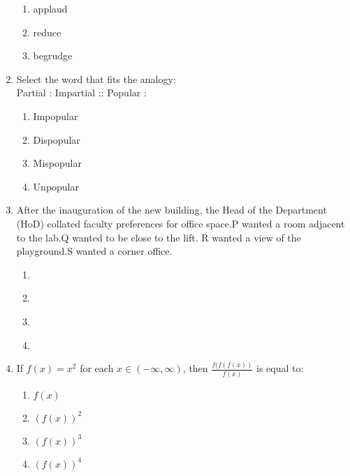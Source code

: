 \documentclass[journal,12pt,onecolumn]{IEEEtran}
\theoremstyle{remark}
\begin{document}
\begin{enumerate}
\begin{enumerate}
        \item applaud
        \item reduce
        \item begrudge
    \end{enumerate}
    \item Select the word that fits the analogy:\\
    Partial : Impartial :: Popular :
    \begin{enumerate}
        \item Impopular
        \item Dispopular
        \item Mispopular
        \item Unpopular
    \end{enumerate}
    \item After the inauguration of the new building, the Head of the Department (HoD) collated faculty preferences for office space.P wanted a room adjacent to the lab.Q wanted to be close to the lift. R wanted a view of the playground.S wanted a corner office.
    \begin{enumerate}
        \item \begin{figure}[H]
        \centering
          
    \end{figure}
        \item \begin{figure}[H]
        \centering
        
    \end{figure}
    \item \begin{figure}[H]
        \centering
         
    \end{figure}
    \item \begin{figure}[H]
        \centering
        
    \end{figure}
    \end{enumerate}
    \item If $f(x) = x^2$ for each $x \in (-\infty, \infty)$, then $\frac{f(f(f(x))}{f(x)}$ is equal to:
    \begin{enumerate}
        \item $f(x)$
        \item $(f(x))^2$
        \item $(f(x))^3$
        \item $(f(x))^4$
    \end{enumerate}

\end{enumerate}
\end{document}
